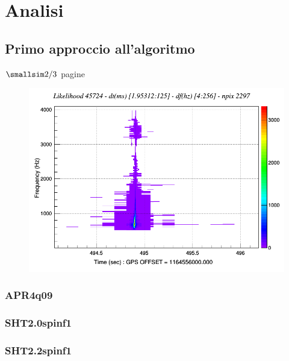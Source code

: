 \chapter{Analisi}
\label{chapter:analisi}
\section{Primo approccio all'algoritmo}
\label{section:analisiSimSingole}
\begin{center}
	$\smallsim 2/3$ pagine
\end{center}
	
\begin{center}
	\begin{figure}[H]
		\centering
		\includegraphics[scale=0.38, angle=0]{figures/Capitolo_4/APR4_q09/layer4_10__distance5_1250_2500_5000/ced_1164556010_790_O4I_GN_LHV_SIM_PMNS_APR4_q09_NEW_4_job1/L1H1V1_1164556494.250_1164556494.250_1164556494.250/l_tfmap_scalogram.png}
		\setlength{\belowcaptionskip}{-20pt}
		\caption{}
		\label{fig:APR4q09/likelihood}
	\end{figure}
\end{center}	
\subsection{APR4q09}



\subsection{SHT2.0spinf1}

\subsection{SHT2.2spinf1}


